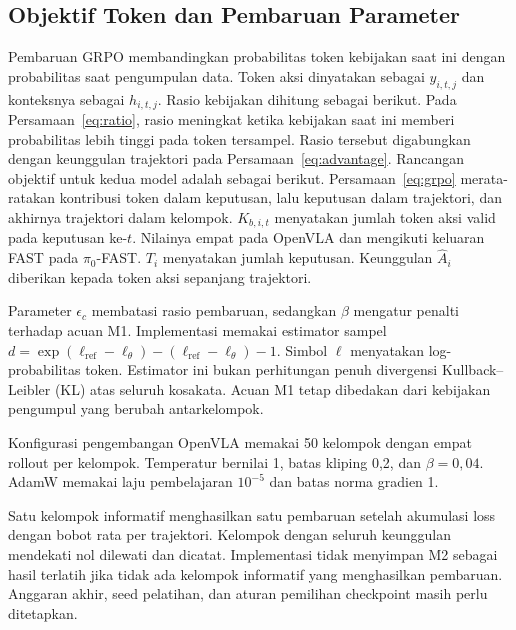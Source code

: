 \subsection{Objektif Token dan Pembaruan Parameter}
Pembaruan GRPO membandingkan probabilitas token kebijakan saat ini dengan probabilitas saat pengumpulan data. Token aksi dinyatakan sebagai $y_{i,t,j}$ dan konteksnya sebagai $h_{i,t,j}$. Rasio kebijakan dihitung sebagai berikut.
Pada Persamaan~\ref{eq:ratio}, rasio meningkat ketika kebijakan saat ini memberi probabilitas lebih tinggi pada token tersampel. Rasio tersebut digabungkan dengan keunggulan trajektori pada Persamaan~\ref{eq:advantage}. Rancangan objektif untuk kedua model adalah sebagai berikut.
Persamaan~\ref{eq:grpo} merata-ratakan kontribusi token dalam keputusan, lalu keputusan dalam trajektori, dan akhirnya trajektori dalam kelompok. $K_{b,i,t}$ menyatakan jumlah token aksi valid pada keputusan ke-$t$. Nilainya empat pada OpenVLA dan mengikuti keluaran FAST pada $\pi_0$-FAST. $T_i$ menyatakan jumlah keputusan. Keunggulan $\hat A_i$ diberikan kepada token aksi sepanjang trajektori.

Parameter $\epsilon_c$ membatasi rasio pembaruan, sedangkan $\beta$ mengatur penalti terhadap acuan M1. Implementasi memakai estimator sampel $d=\exp(\ell_{\mathrm{ref}}-\ell_\theta)-(\ell_{\mathrm{ref}}-\ell_\theta)-1$. Simbol $\ell$ menyatakan log-probabilitas token. Estimator ini bukan perhitungan penuh divergensi Kullback--Leibler (KL) atas seluruh kosakata. Acuan M1 tetap dibedakan dari kebijakan pengumpul yang berubah antarkelompok.

Konfigurasi pengembangan OpenVLA memakai 50 kelompok dengan empat rollout per kelompok. Temperatur bernilai 1, batas kliping 0,2, dan $\beta=0{,}04$. AdamW memakai laju pembelajaran $10^{-5}$ dan batas norma gradien 1.

Satu kelompok informatif menghasilkan satu pembaruan setelah akumulasi loss dengan bobot rata per trajektori. Kelompok dengan seluruh keunggulan mendekati nol dilewati dan dicatat. Implementasi tidak menyimpan M2 sebagai hasil terlatih jika tidak ada kelompok informatif yang menghasilkan pembaruan. Anggaran akhir, seed pelatihan, dan aturan pemilihan checkpoint masih perlu ditetapkan.

